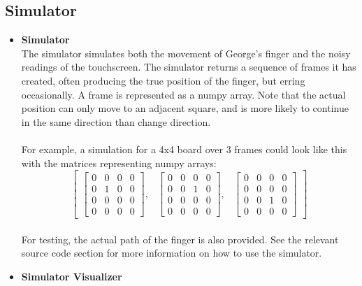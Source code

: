 \documentclass{article}
\begin{document}
    \subsection{Simulator}
    \begin{itemize}
        \item \textbf{Simulator} \\
        The simulator simulates both the movement of George’s finger and the noisy readings of the touchscreen.
        The simulator returns a sequence of frames it has created, often producing the true position of the
        finger, but erring occasionally. A frame is represented as a numpy array. Note that the actual position
        can only move to an adjacent square, and is more likely to continue in the same direction than change
        direction.\\\\
        For example, a simulation for a 4x4 board over 3 frames could look like this with the matrices representing numpy arrays:
        $$\begin{bmatrix}
              \begin{bmatrix}
                  0 & 0 & 0 & 0 \\
                  0 & 1 & 0 & 0 \\
                  0 & 0 & 0 & 0 \\
                  0 & 0 & 0 & 0
              \end{bmatrix}, &
              \begin{bmatrix}
                  0 & 0 & 0 & 0 \\
                  0 & 0 & 1 & 0 \\
                  0 & 0 & 0 & 0 \\
                  0 & 0 & 0 & 0
              \end{bmatrix}, &
              \begin{bmatrix}
                  0 & 0 & 0 & 0 \\
                  0 & 0 & 0 & 0 \\
                  0 & 0 & 1 & 0 \\
                  0 & 0 & 0 & 0
              \end{bmatrix}
        \end{bmatrix}$$\\
        For testing, the actual path of the finger is also provided. See the relevant source code section for more information on how to use the simulator.
        \item \textbf{Simulator Visualizer}\\

\end{itemize}
\end{document}
